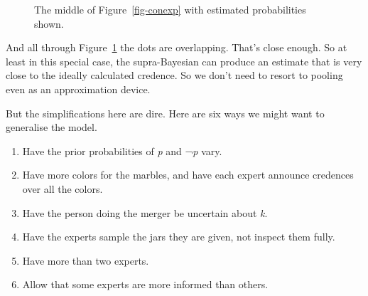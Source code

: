 \documentclass[
  10pt,
  letterpaper,
  DIV=11,
  numbers=noendperiod,
  twoside]{scrartcl}
\providecommand{\tightlist}{%
  \setlength{\itemsep}{0pt}\setlength{\parskip}{0pt}}\usepackage{longtable,booktabs,array}
\begin{document}
\begin{figure}


\caption{\label{fig-twoprob-middle}The middle of Figure~\ref{fig-conexp}
with estimated probabilities shown.}

\end{figure}%

And all through Figure~\ref{fig-twoprob-middle} the dots are
overlapping. That's close enough. So at least in this special case, the
supra-Bayesian can produce an estimate that is very close to the ideally
calculated credence. So we don't need to resort to pooling even as an
approximation device.

But the simplifications here are dire. Here are six ways we might want
to generalise the model.

\begin{enumerate}
\def\labelenumi{\arabic{enumi}.}
\tightlist
\item
  Have the prior probabilities of \emph{p} and ¬\emph{p} vary.
\item
  Have more colors for the marbles, and have each expert announce
  credences over all the colors.
\item
  Have the person doing the merger be uncertain about \emph{k}.
\item
  Have the experts sample the jars they are given, not inspect them
  fully.
\item
  Have more than two experts.
\item
  Allow that some experts are more informed than others.
\end{enumerate}
\end{document}
